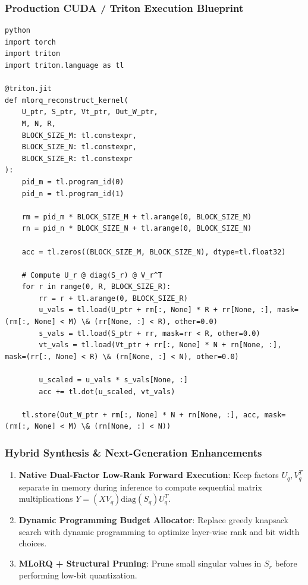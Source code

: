 \subsubsection*{Production CUDA / Triton Execution Blueprint}

\vspace{0.5em}
\begin{mdframed}[backgroundcolor=codebg, linecolor=codeframe, linewidth=1pt, roundcorner=4pt, innerleftmargin=2pt, innerrightmargin=5pt, innertopmargin=5pt, innerbottommargin=5pt]
\begin{lstlisting}
python
import torch
import triton
import triton.language as tl

@triton.jit
def mlorq_reconstruct_kernel(
    U_ptr, S_ptr, Vt_ptr, Out_W_ptr,
    M, N, R,
    BLOCK_SIZE_M: tl.constexpr,
    BLOCK_SIZE_N: tl.constexpr,
    BLOCK_SIZE_R: tl.constexpr
):
    pid_m = tl.program_id(0)
    pid_n = tl.program_id(1)

    rm = pid_m * BLOCK_SIZE_M + tl.arange(0, BLOCK_SIZE_M)
    rn = pid_n * BLOCK_SIZE_N + tl.arange(0, BLOCK_SIZE_N)

    acc = tl.zeros((BLOCK_SIZE_M, BLOCK_SIZE_N), dtype=tl.float32)

    # Compute U_r @ diag(S_r) @ V_r^T
    for r in range(0, R, BLOCK_SIZE_R):
        rr = r + tl.arange(0, BLOCK_SIZE_R)
        u_vals = tl.load(U_ptr + rm[:, None] * R + rr[None, :], mask=(rm[:, None] < M) \& (rr[None, :] < R), other=0.0)
        s_vals = tl.load(S_ptr + rr, mask=rr < R, other=0.0)
        vt_vals = tl.load(Vt_ptr + rr[:, None] * N + rn[None, :], mask=(rr[:, None] < R) \& (rn[None, :] < N), other=0.0)

        u_scaled = u_vals * s_vals[None, :]
        acc += tl.dot(u_scaled, vt_vals)

    tl.store(Out_W_ptr + rm[:, None] * N + rn[None, :], acc, mask=(rm[:, None] < M) \& (rn[None, :] < N))
\end{lstlisting}
\end{mdframed}
\vspace{0.5em}


\subsubsection*{Hybrid Synthesis \& Next-Generation Enhancements}

\begin{enumerate}
\item \textbf{Native Dual-Factor Low-Rank Forward Execution}: Keep factors $U_q, V_q^T$ separate in memory during inference to compute sequential matrix multiplications $Y = (X V_q) \text{diag}(S_q) U_q^T$.
\item \textbf{Dynamic Programming Budget Allocator}: Replace greedy knapsack search with dynamic programming to optimize layer-wise rank and bit width choices.
\item \textbf{MLoRQ + Structural Pruning}: Prune small singular values in $S_r$ before performing low-bit quantization.

\end{enumerate}
